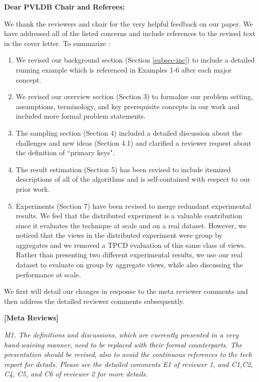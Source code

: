 {\noindent \normalsize \bf Dear PVLDB Chair and Referees: }

\vspace{.5em}
We thank the reviewers and chair for the very helpful feedback on our paper. We have addressed all of the listed concerns and include references to the revised text in the cover letter. 
To summarize :
\begin{enumerate}
\item We revised our background section (Section \ref{subsec-inc}) to include a detailed running example which is referenced in Examples 1-6 after each major concept.
\item We revised our overview section (Section 3) to formalize our problem setting, assumptions, terminology, and key prerequisite concepts in our work and included more formal problem statements.
\item The sampling section (Section 4) included a detailed discussion about the challenges and new ideas (Section 4.1) and clarified a reviewer request about the definition of ``primary keys".
\item The result estimation (Section 5) has been revised to include itemized descriptions of all of the algorithms and is self-contained with respect to our prior work.
\item Experiments (Section 7) have been revised to merge redundant experimental results. We feel that the distributed experiment is a valuable contribution since it evaluates the technique at scale and on a real dataset. However, we noticed that the views in the distributed experiment were group by aggregates and we removed a TPCD evaluation of this same class of views.
Rather than presenting two different experimental results, we use our real dataset to evaluate \svc on group by aggregate views, while also discussing the performance at scale. 
\end{enumerate}
We first will detail our changes in response to the meta reviewer comments and then address the detailed reviewer comments subsequently.

\vspace{2em}
\noindent\textbf{[Meta Reviews]}
\vspace{1em}

\emph{M1. The definitions and discussions, which are currently presented in a very hand-waiving manner, need to be replaced with their formal counterparts. The presentation should be revised, also to avoid the continuous references to the tech report for details. Please see the detailed comments E1 of reviewer 1, and C1,C2, C4, C5, and C6 of reviewer 2 for more details.}
\vspace{.25em}

